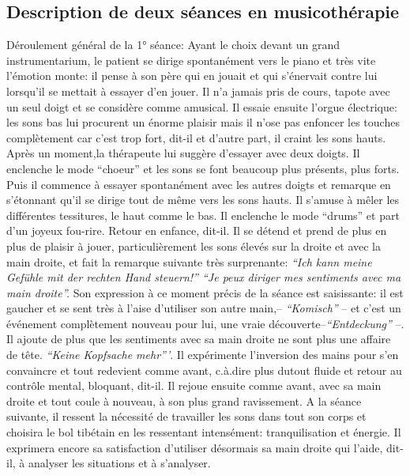  	\subsection{Description de deux  séances en musicothérapie}
 	Déroulement général de la 1° séance: 
Ayant le choix devant un grand instrumentarium,
        le patient se dirige spontanément vers le piano et très vite
        l'émotion monte: il pense à son père qui en jouait et qui
        s'énervait contre lui lorsqu'il se mettait  à essayer d'en
        jouer. Il n'a jamais pris de cours, tapote avec un seul doigt et se considère comme
        amusical. Il essaie ensuite l'orgue électrique: les sons bas
        lui procurent un énorme plaisir mais il n'ose pas enfoncer les touches
        complètement car c'est trop fort, dit-il et d'autre part, il craint les
        sons hauts.
        Après un moment,la thérapeute lui suggère d'essayer avec deux doigts.
        Il enclenche le mode ``choeur'' et les sons se font beaucoup
        plus présents, plus forts. Puis il commence à essayer spontanément
        avec les autres doigts et remarque en s'étonnant qu'il se
        dirige tout de même vers les sons
        hauts. Il s'amuse à mêler les différentes tessitures,
        le haut comme le bas.
        Il enclenche le mode ``drums'' et part d'un joyeux
        fou-rire. Retour en enfance, dit-il.
        Il se détend et prend de plus en plus de plaisir à jouer, particulièrement  les sons élevés
        sur la droite et avec la main droite, et fait
        la remarque suivante très surprenante:
        \textit{``Ich kann meine Gefühle mit der rechten Hand steuern!''
        ``Je peux diriger mes sentiments avec ma main droite''.}
 Son expression à ce moment précis de la séance est saisissante: il
        est gaucher et se sent très à l'aise d'utiliser son autre
        main,-- \textit{``Komisch''} -- et c'est un événement complètement nouveau pour lui, une vraie
        découverte--\textit{``Entdeckung''} --.
        Il ajoute de plus que les sentiments avec sa main
        droite ne sont plus une affaire de tête. \textit{``Keine
        Kopfsache mehr'''}. Il expérimente l'inversion des mains pour s'en convaincre et tout redevient comme
        avant, c.à.dire plus dutout fluide et retour au contrôle
        mental, 
        bloquant, dit-il. Il rejoue ensuite comme avant, avec sa main droite et tout
        coule à nouveau, à son plus grand ravissement.
        A la séance suivante, il ressent la nécessité de travailler
        les sons dans tout son corps et choisira le bol tibétain en
        les 
        ressentant intensément: tranquilisation et
        énergie. Il
        exprimera encore sa satisfaction d'utiliser désormais  sa main
        droite qui l'aide, dit-il, à analyser les
        situations et à 
        s'analyser.

